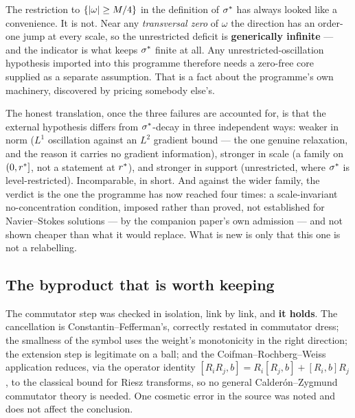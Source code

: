 \begin{obsv}
\label{obs:pt-indicator}
The restriction to \(\{\left|\omega\right|\geq M/4\}\) in the definition of \(\sigma^{*}\)
has always looked like a convenience. It is not. Near any \emph{transversal
zero} of \(\omega\) the direction has an order-one jump at every scale, so the
unrestricted deficit is \textbf{generically infinite} --- and the indicator is
what keeps \(\sigma^{*}\) finite at all. Any unrestricted-oscillation hypothesis
imported into this programme therefore needs a zero-free core supplied as a
separate assumption. That is a fact about the programme's own machinery,
discovered by pricing somebody else's.
\end{obsv}

The honest translation, once the three failures are accounted for, is that the
external hypothesis differs from \(\sigma^{*}\)-decay in three independent ways:
weaker in norm (\(L^1\) oscillation against an \(L^2\) gradient bound --- the
one genuine relaxation, and the reason it carries no gradient information),
stronger in scale (a family on \((0,r^{*}]\), not a statement at \(r^{*}\)),
and stronger in support (unrestricted, where \(\sigma^{*}\) is level-restricted).
Incomparable, in short. And against the wider family, the verdict is the one the
programme has now reached four times: a scale-invariant no-concentration
condition, imposed rather than proved, not established for Navier--Stokes
solutions --- by the companion paper's own admission --- and not shown cheaper
than what it would replace. What is new is only that this one is not a
relabelling.

\subsection{The byproduct that is worth keeping}

The commutator step was checked in isolation, link by link, and \textbf{it
holds}. The cancellation is Constantin--Fefferman's, correctly restated in
commutator dress; the smallness of the symbol uses the weight's monotonicity in
the right direction; the extension step is legitimate on a ball; and the
Coifman--Rochberg--Weiss application reduces, via the operator identity
\([R_iR_j,b]=R_i[R_j,b]+[R_i,b]R_j\), to the classical bound for Riesz
transforms, so no general Calder\'on--Zygmund commutator theory is needed. One
cosmetic error in the source was noted and does not affect the conclusion.

